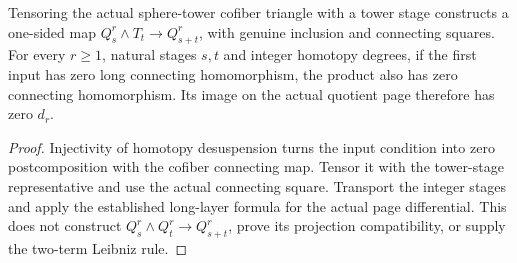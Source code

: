 \begin{proposition}
  \label{prop:h6-long-layer-stage-kernel}
  \leanok
  Tensoring the actual sphere-tower cofiber triangle with a tower stage
  constructs a one-sided map $Q_s^r\wedge T_t\to Q_{s+t}^r$, with genuine
  inclusion and connecting squares. For every $r\geq1$, natural stages
  $s,t$ and integer homotopy degrees, if the first input has zero long
  connecting homomorphism, the product also has zero connecting
  homomorphism. Its image on the actual quotient page therefore has
  zero $d_r$.
\end{proposition}
\begin{proof}
  \leanok
  Injectivity of homotopy desuspension turns the input condition into
  zero postcomposition with the cofiber connecting map. Tensor it with
  the tower-stage representative and use the actual connecting square.
  Transport the integer stages and apply the established long-layer
  formula for the actual page differential.
  This does not construct $Q_s^r\wedge Q_t^r\to Q_{s+t}^r$, prove its
  projection compatibility, or supply the two-term Leibniz rule.
\end{proof}

